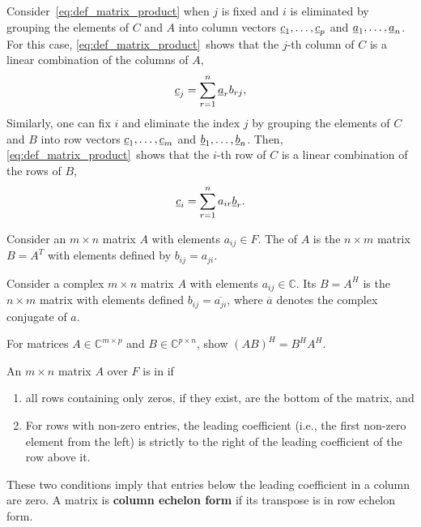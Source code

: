 \begin{remark}
Consider~\eqref{eq:def_matrix_product} when $j$ is fixed and $i$ is eliminated by grouping the elements of $C$ and $A$ into column vectors $\underline{c}_1,\ldots,\underline{c}_{p}$ and $\underline{a}_1,\ldots,\underline{a}_n$. For this case, \eqref{eq:def_matrix_product}~shows that the $j$-th column of $C$ is a linear combination of the columns of $A$,
\[ \underline{c}_{j} = \sum_{r = 1}^n \underline{a}_r b_{rj}, \]
Similarly, one can fix $i$ and eliminate the index $j$ by grouping the elements of $C$ and $B$ into row vectors  $\underline{c}_1,\ldots,\underline{c}_{m}$ and $\underline{b}_1,\ldots,\underline{b}_n$.
Then, \eqref{eq:def_matrix_product}~shows that the $i$-th row of $C$ is a linear combination of the rows of $B$,
\[ \underline{c}_{i} = \sum_{r = 1}^n a_{ir} \underline{b}_r. \]
\end{remark}

\begin{definition}
Consider an $m \times n$ matrix $A$ with elements $a_{ij} \in F$.
The  of $A$ is the $n \times m$ matrix $B = A^T$ with elements defined by $b_{ij} = a_{ji}$.
\end{definition}

\begin{definition}
Consider a complex $m \times n$ matrix $A$ with elements $a_{ij} \in \mathbb{C}$.
Its  $B = A^H$ is the $n \times m$ matrix with elements defined $b_{ij} = \overline{a_{ji}}$, where $\overline{a}$ denotes the complex conjugate of $a$.
\end{definition}

\begin{problem}
For matrices $A \in \mathbb{C}^{m\times p}$ and $B \in \mathbb{C}^{p \times n}$, show $(AB)^H = B^H A^H$.
\end{problem}

\begin{definition}
An $m\times n$ matrix $A$ over $F$ is in  if
\begin{enumerate}
\item all rows containing only zeros, if they exist, are the bottom of the matrix, and
\item For rows with non-zero entries, the leading coefficient (i.e., the first non-zero element from the left) is strictly to the right of the leading coefficient of the row above it.
\end{enumerate}
These two conditions imply that entries below the leading coefficient in a column are zero.
A matrix is \textbf{column echelon form} if its transpose is in row echelon form.
\end{definition}

